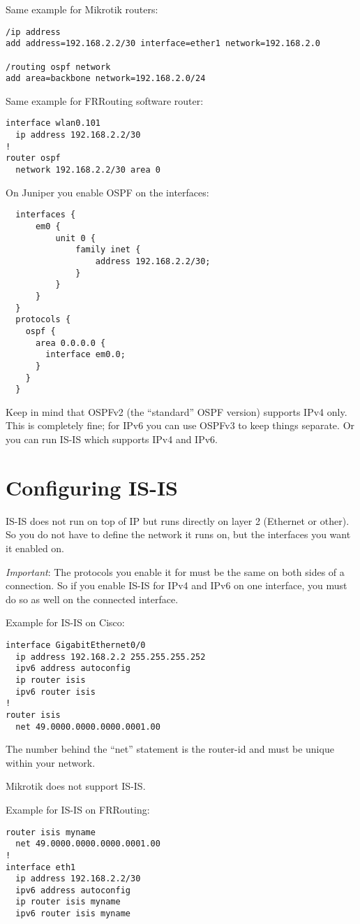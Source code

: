 Same example for Mikrotik routers:
\begin{verbatim}
/ip address
add address=192.168.2.2/30 interface=ether1 network=192.168.2.0

/routing ospf network
add area=backbone network=192.168.2.0/24
\end{verbatim}

Same example for FRRouting software router:
\begin{verbatim}
interface wlan0.101
  ip address 192.168.2.2/30
!
router ospf
  network 192.168.2.2/30 area 0
\end{verbatim}

On Juniper you enable OSPF on the interfaces:
\begin{verbatim}
  interfaces {
      em0 {
          unit 0 {
              family inet {
                  address 192.168.2.2/30;
              }
          }
      }
  }
  protocols {
    ospf {
      area 0.0.0.0 {
        interface em0.0;
      }
    }
  }
\end{verbatim}

Keep in mind that OSPFv2 (the ``standard'' OSPF version) supports IPv4 only. This is completely fine; for IPv6 you can use OSPFv3 to keep things separate. Or you can run IS-IS which supports IPv4 and IPv6.

\section{Configuring IS-IS}
\gls{IS-IS} does not run on top of IP but runs directly on layer 2 (Ethernet or other). So you do not have to define the network it runs on, but the interfaces you want it enabled on.

\emph{Important}: The protocols you enable it for must be the same on both sides of a connection. So if you enable IS-IS for IPv4 and IPv6 on one interface, you must do so as well on the connected interface.

Example for IS-IS on Cisco:
\begin{verbatim}
interface GigabitEthernet0/0
  ip address 192.168.2.2 255.255.255.252
  ipv6 address autoconfig
  ip router isis
  ipv6 router isis
!
router isis
  net 49.0000.0000.0000.0001.00
\end{verbatim}
The number behind the ``net'' statement is the router-id and must be unique within your network.

Mikrotik does not support IS-IS.

Example for IS-IS on FRRouting:
\begin{verbatim}
router isis myname
  net 49.0000.0000.0000.0001.00
!
interface eth1
  ip address 192.168.2.2/30
  ipv6 address autoconfig
  ip router isis myname
  ipv6 router isis myname
\end{verbatim}

